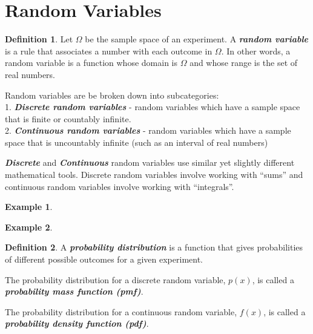 \documentclass[
  11pt,
]{book}
\theoremstyle{definition}
\newtheorem{definition}{Definition}[chapter]
\theoremstyle{definition}
\newtheorem{example}{Example}[chapter]
\theoremstyle{definition}
\theoremstyle{definition}
\theoremstyle{remark}
\begin{document}
\hypertarget{random-variables}{%
\section{Random Variables}\label{random-variables}}

\begin{definition}
Let \(\Omega\) be the sample space of an experiment. A \textbf{\emph{random variable}} is a rule that associates a number with each outcome in \(\Omega\). In other words, a random variable is a function whose domain is \(\Omega\) and whose range is the set of real numbers.
\end{definition}

Random variables are be broken down into subcategories:\\
1. \textbf{\emph{Discrete random variables}} - random variables which have a sample space that is finite or countably infinite.\\
2. \textbf{\emph{Continuous random variables}} - random variables which have a sample space that is uncountably infinite (such as an interval of real numbers)

\textbf{\emph{Discrete}} and \textbf{\emph{Continuous}} random variables use similar yet slightly different mathematical tools. Discrete random variables involve working with ``sums'' and continuous random variables involve working with ``integrals''.

\begin{example}
\[ \]
\end{example}

\hfill\break
\hfill\break
\hfill\break

\begin{example}
\[ \]
\end{example}

\hfill\break
\hfill\break
\hfill\break

\begin{definition}
A \textbf{\emph{probability distribution}} is a function that gives probabilities of different possible outcomes for a given experiment.
\end{definition}

The probability distribution for a discrete random variable, \(p(x)\), is called a \textbf{\emph{probability mass function (pmf)}}.

The probability distribution for a continuous random variable, \(f(x)\), is called a \textbf{\emph{probability density function (pdf)}}.
\end{document}
